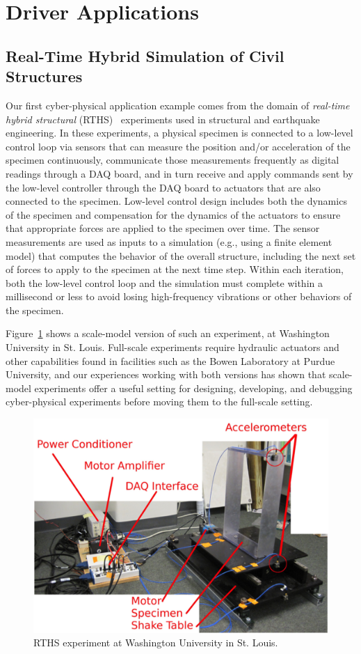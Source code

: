 \section{Driver Applications}
\label{sec:apps}


\subsection{Real-Time Hybrid Simulation of Civil Structures}

Our first cyber-physical application example comes from the domain of
\emph{real-time hybrid structural} (RTHS)~\cite{RTHS} experiments used in
structural and earthquake engineering.  In these experiments, a physical
specimen is connected to a low-level control loop via sensors
that can measure the position and/or acceleration of the specimen continuously,
communicate those measurements frequently as digital readings through a DAQ
board, and in turn receive and apply commands sent by the low-level
controller through the DAQ board to actuators that are also connected to
the specimen.  Low-level control design includes both the dynamics of
the specimen and compensation for the dynamics of
the actuators to ensure that appropriate forces are applied to the specimen
over time. The sensor measurements are used as inputs to a simulation
(e.g., using a finite element model) that computes the behavior of the overall structure,
including the next set of forces to apply to the specimen at the next time step.  Within
each iteration, both the low-level control loop and the simulation must complete within a
millisecond or less to avoid losing high-frequency vibrations or other behaviors
of the specimen.

Figure~\ref{fig:rths} shows a scale-model version of such an experiment, at
Washington University in St. Louis.  Full-scale experiments require hydraulic
actuators and other capabilities found in facilities such as the Bowen Laboratory
at Purdue University, and our experiences working with both versions has shown
that scale-model experiments offer a useful setting for designing, developing, and
debugging cyber-physical experiments before moving them to the full-scale setting.

\begin{figure}[ht]
\centering
\includegraphics[width=0.5\columnwidth]{rths}
\caption{RTHS experiment at Washington University in St. Louis.}
\label{fig:rths}
\end{figure}


